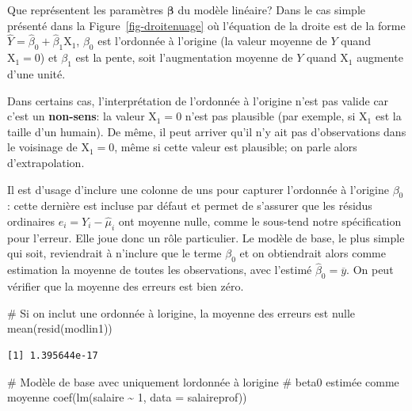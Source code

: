 \documentclass[
  11pt,
  letterpaper,
]{scrbook}
\newenvironment{Shaded}{\begin{snugshade}}{\end{snugshade}}
\newcommand{\AttributeTok}[1]{\textcolor[rgb]{0.40,0.45,0.13}{#1}}
\newcommand{\CommentTok}[1]{\textcolor[rgb]{0.37,0.37,0.37}{#1}}
\newcommand{\DecValTok}[1]{\textcolor[rgb]{0.68,0.00,0.00}{#1}}
\newcommand{\FunctionTok}[1]{\textcolor[rgb]{0.28,0.35,0.67}{#1}}
\newcommand{\NormalTok}[1]{\textcolor[rgb]{0.00,0.23,0.31}{#1}}
\newcommand{\SpecialCharTok}[1]{\textcolor[rgb]{0.37,0.37,0.37}{#1}}
\theoremstyle{definition}
\theoremstyle{remark}
\begin{document}
Que représentent les paramètres \(\boldsymbol{\beta}\) du modèle
linéaire? Dans le cas simple présenté dans la
Figure~\ref{fig-droitenuage} où l'équation de la droite est de la forme
\(\widehat{Y} = \widehat{\beta}_0 + \widehat{\beta}_1\mathrm{X}_1\),
\(\beta_0\) est l'ordonnée à l'origine (la valeur moyenne de \(Y\) quand
\(\mathrm{X}_1=0\)) et \(\beta_1\) est la pente, soit l'augmentation
moyenne de \(Y\) quand \(\mathrm{X}_1\) augmente d'une unité.

Dans certains cas, l'interprétation de l'ordonnée à l'origine n'est pas
valide car c'est un \textbf{non-sens}: la valeur \(\mathrm{X}_1=0\)
n'est pas plausible (par exemple, si \(\mathrm{X}_1\) est la taille d'un
humain). De même, il peut arriver qu'il n'y ait pas d'observations dans
le voisinage de \(\mathrm{X}_1=0\), même si cette valeur est plausible;
on parle alors d'extrapolation.

Il est d'usage d'inclure une colonne de uns pour capturer l'ordonnée à
l'origine \(\beta_0\): cette dernière est incluse par défaut et permet
de s'assurer que les résidus ordinaires \(e_i = Y_i - \widehat{\mu}_i\)
ont moyenne nulle, comme le sous-tend notre spécification pour l'erreur.
Elle joue donc un rôle particulier. Le modèle de base, le plus simple
qui soit, reviendrait à n'inclure que le terme \(\beta_0\) et on
obtiendrait alors comme estimation la moyenne de toutes les
observations, avec l'estimé \(\widehat{\beta}_0 = \overline{y}\). On
peut vérifier que la moyenne des erreurs est bien zéro.

\begin{Shaded}
\begin{Highlighting}[]
\CommentTok{\# Si on inclut une ordonnée à l\textquotesingle{}origine, la moyenne des erreurs est nulle}
\FunctionTok{mean}\NormalTok{(}\FunctionTok{resid}\NormalTok{(modlin1))}
\end{Highlighting}
\end{Shaded}

\begin{verbatim}
[1] 1.395644e-17
\end{verbatim}

\begin{Shaded}
\begin{Highlighting}[]
\CommentTok{\# Modèle de base avec uniquement l\textquotesingle{}ordonnée à l\textquotesingle{}origine}
\CommentTok{\# beta0 estimée comme moyenne}
\FunctionTok{coef}\NormalTok{(}\FunctionTok{lm}\NormalTok{(salaire }\SpecialCharTok{\textasciitilde{}} \DecValTok{1}\NormalTok{, }\AttributeTok{data =}\NormalTok{ salaireprof))}
\end{Highlighting}
\end{Shaded}
\end{document}
